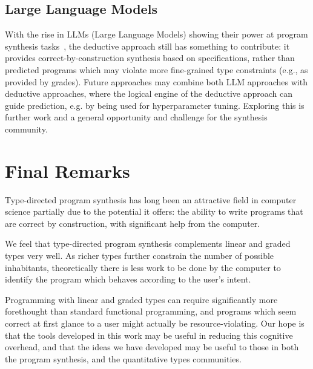 \subsection{Large Language Models}
With the rise in LLMs (Large Language Models) showing their power at program
synthesis tasks~\citep{DBLP:journals/corr/abs-2108-07732,jain2021jigsaw}, the
deductive approach still has something to contribute: it provides
correct-by-construction synthesis based on specifications, rather than predicted
programs which may violate more fine-grained type constraints (e.g., as provided
by grades). Future approaches may combine both LLM approaches with deductive
approaches, where the logical engine of the deductive approach can guide
prediction, e.g. by being used for hyperparameter tuning. Exploring this is
further work and a general opportunity and challenge for the synthesis
community.


\section{Final Remarks}
Type-directed program synthesis has long been an attractive field in
computer science partially due to the potential it offers: the ability to write
programs that are correct by construction, with significant help from the
computer. 

We feel that type-directed program synthesis complements linear and graded types
very well. As richer types further constrain the number of possible inhabitants,
theoretically there is less work to be done by the computer to identify the
program which behaves according to the user's intent.

Programming with linear and graded types can require significantly more
forethought than standard functional programming, and programs which seem
correct at first glance to a user might actually be resource-violating. Our hope
is that the tools developed in this work may be useful in reducing this
cognitive overhead, and that the ideas we have developed may be useful to those
in both the program synthesis, and the quantitative types communities.
